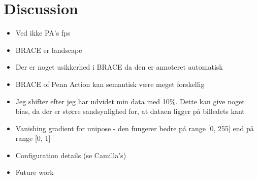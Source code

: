 \documentclass[./main.tex]{subfiles}
\begin{document}
\section{Discussion}
\begin{itemize}
    \item Ved ikke PA's fps
    \item BRACE er landscape
    \item Der er noget usikkerhed i BRACE da den er annoteret automatisk
    \item BRACE of Penn Action kan semantisk være meget forskellig
    \item Jeg shifter efter jeg har udvidet min data med 10\%. Dette kan give noget bias, da der er større sandsynlighed for, at dataen ligger på billedets kant
    \item Vanishing gradient for unipose - den fungerer bedre på range [0, 255] end på range [0, 1]
    \item Configuration details (se Camilla's)
    \item Future work
\end{itemize}
\end{document}
